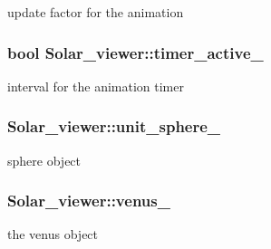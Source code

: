 update factor for the animation 

\subsubsection[{\texorpdfstring{timer\+\_\+active\+\_\+}{timer_active_}}]{\setlength{\rightskip}{0pt plus 5cm}bool Solar\+\_\+viewer\+::timer\+\_\+active\+\_\+\hspace{0.3cm}{\ttfamily [private]}}\hypertarget{classSolar__viewer_aedc75568a6aafd2ecf8245ed518f6214}{}\label{classSolar__viewer_aedc75568a6aafd2ecf8245ed518f6214}


interval for the animation timer 

\subsubsection[{\texorpdfstring{unit\+\_\+sphere\+\_\+}{unit_sphere_}}]{ Solar\+\_\+viewer\+::unit\+\_\+sphere\+\_\+\hspace{0.3cm}{\ttfamily [private]}}\hypertarget{classSolar__viewer_a47d90d63f22fd4e9e58651e9e9c7baef}{}\label{classSolar__viewer_a47d90d63f22fd4e9e58651e9e9c7baef}


sphere object 

\subsubsection[{\texorpdfstring{venus\+\_\+}{venus_}}]{ Solar\+\_\+viewer\+::venus\+\_\+\hspace{0.3cm}{\ttfamily [private]}}\hypertarget{classSolar__viewer_a52df2043cba78b9afef933ce6515303d}{}\label{classSolar__viewer_a52df2043cba78b9afef933ce6515303d}


the venus object 

